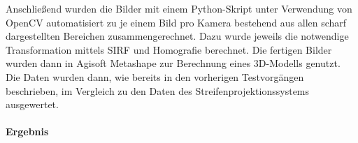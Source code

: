 \documentclass[./00PhotoBox.tex]{subfiles}
\begin{document}
Anschließend wurden die Bilder mit einem Python-Skript unter Verwendung von OpenCV automatisiert zu je einem Bild pro Kamera bestehend aus allen scharf dargestellten Bereichen zusammengerechnet. Dazu wurde jeweils die notwendige Transformation mittels SIRF und Homografie berechnet. Die fertigen Bilder wurden dann in Agisoft Metashape zur Berechnung eines 3D-Modells genutzt. Die Daten wurden dann, wie bereits in den vorherigen Testvorgängen beschrieben, im Vergleich zu den Daten des Streifenprojektionssystems ausgewertet.

\paragraph{Ergebnis}

\biblio
\end{document}
